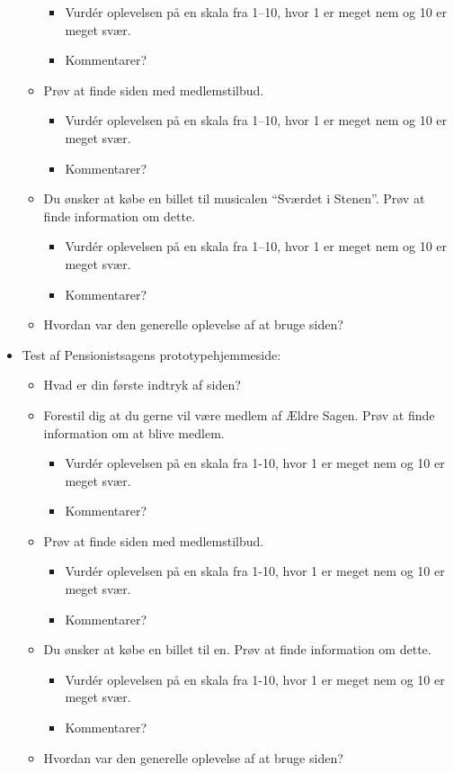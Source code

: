 \begin{itemize}
\begin{itemize}
\begin{itemize}
            \item Vurdér oplevelsen på en skala fra 1--10, hvor 1 er meget nem og 10 er meget svær.
            \item Kommentarer?
        \end{itemize}
        \item Prøv at finde siden med medlemstilbud.
        \begin{itemize}
            \item Vurdér oplevelsen på en skala fra 1--10, hvor 1 er meget nem og 10 er meget svær.
            \item Kommentarer?
        \end{itemize}
        \item Du ønsker at købe en billet til musicalen ``Sværdet i Stenen''. Prøv at finde information om dette.
        \begin{itemize}
            \item Vurdér oplevelsen på en skala fra 1--10, hvor 1 er meget nem og 10 er meget svær.
            \item Kommentarer?
        \end{itemize}
        \item Hvordan var den generelle oplevelse af at bruge siden?
    \end{itemize}
    \item Test af Pensionistsagens prototypehjemmeside:
    \begin{itemize}
        \item Hvad er din første indtryk af siden?
        \item Forestil dig at du gerne vil være medlem af Ældre Sagen. Prøv at finde information om at blive medlem.
        \begin{itemize}
            \item Vurdér oplevelsen på en skala fra 1-10, hvor 1 er meget nem og 10 er meget svær.
            \item Kommentarer?
        \end{itemize}
        \item Prøv at finde siden med medlemstilbud.
        \begin{itemize}
            \item Vurdér oplevelsen på en skala fra 1-10, hvor 1 er meget nem og 10 er meget svær.
            \item Kommentarer?
        \end{itemize}
        \item Du ønsker at købe en billet til en. Prøv at finde information om dette.
        \begin{itemize}
            \item Vurdér oplevelsen på en skala fra 1-10, hvor 1 er meget nem og 10 er meget svær.
            \item Kommentarer?
        \end{itemize}
        \item Hvordan var den generelle oplevelse af at bruge siden?
    \end{itemize}
\end{itemize}
